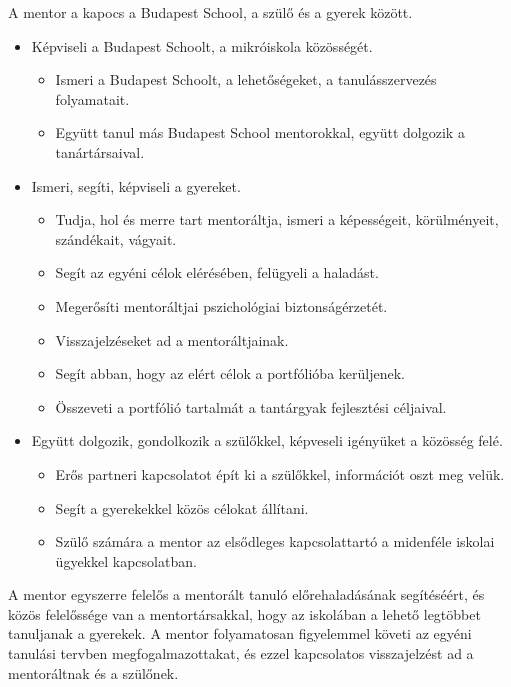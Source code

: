   A mentor a kapocs a Budapest School, a szülő és a gyerek között.

  \begin{itemize}
   \item Képviseli a Budapest Schoolt, a mikróiskola közösségét.
    \begin{itemize}
      \item Ismeri a Budapest Schoolt, a lehetőségeket, a tanulásszervezés folyamatait.
      \item Együtt tanul más Budapest School mentorokkal, együtt dolgozik a tanártársaival.
   \end{itemize}

  \item Ismeri, segíti, képviseli a gyereket.
  \begin{itemize}
    \item  Tudja, hol és merre tart mentoráltja, ismeri a képességeit, körülményeit, szándékait, vágyait.
    \item    Segít az egyéni célok elérésében, felügyeli a haladást.
    \item    Megerősíti mentoráltjai pszichológiai biztonságérzetét.
    \item   Visszajelzéseket ad a mentoráltjainak.
    \item    Segít abban, hogy az elért célok a portfólióba kerüljenek.
    \item    Összeveti a portfólió tartalmát a tantárgyak fejlesztési céljaival.
  \end{itemize}

  \item Együtt dolgozik, gondolkozik a szülőkkel, képveseli igényüket a közösség felé.
  \begin{itemize}
    \item Erős partneri kapcsolatot épít ki a szülőkkel, információt oszt meg velük.
    \item Segít a gyerekekkel közös célokat állítani.
    \item Szülő számára a mentor az elsődleges kapcsolattartó a midenféle iskolai ügyekkel kapcsolatban.
  \end{itemize}

\end{itemize}

  A mentor egyszerre felelős a mentorált tanuló előrehaladásának segítéséért, és
  közös felelőssége van a mentortársakkal, hogy az iskolában a lehető legtöbbet
  tanuljanak a gyerekek. A mentor folyamatosan figyelemmel követi az egyéni
  tanulási tervben megfogalmazottakat, és ezzel kapcsolatos visszajelzést ad a
  mentoráltnak és a szülőnek.

